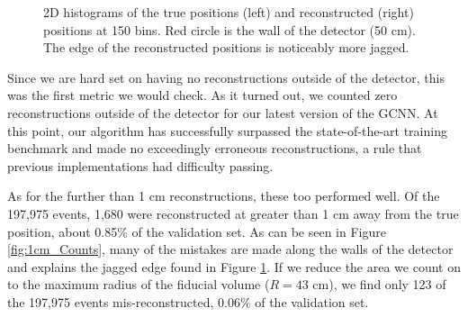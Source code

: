 \documentclass[../thesis.tex]{subfiles}
\begin{document}
\begin{figure}[t]
\begin{subfigure}[b]{0.45\textwidth}
	\end{subfigure}
	\caption{
	2D histograms of the true positions (left) and reconstructed (right) positions at 150 bins.
	Red circle is the wall of the detector (50 cm).
	The edge of the reconstructed positions is noticeably more jagged.
	}
	\label{fig:2D_Hists}
\end{figure}

\par Since we are hard set on having no reconstructions outside of the detector, this was the first metric we would check.
As it turned out, we counted zero reconstructions outside of the detector for our latest version of the GCNN.
At this point, our algorithm has successfully surpassed the state-of-the-art training benchmark and made no exceedingly erroneous reconstructions, a rule that previous implementations had difficulty passing.

\par As for the further than 1 cm reconstructions, these too performed well.
Of the 197,975 events, 1,680 were reconstructed at greater than 1 cm away from the true position, about 0.85\% of the validation set.
As can be seen in Figure \ref{fig:1cm_Counts}, many of the mistakes are made along the walls of the detector and explains the jagged edge found in Figure \ref{fig:2D_Hists}.
If we reduce the area we count on to the maximum radius of the fiducial volume ($R=43$ cm), we find only 123 of the 197,975 events mis-reconstructed, 0.06\% of the validation set.
\end{document}
